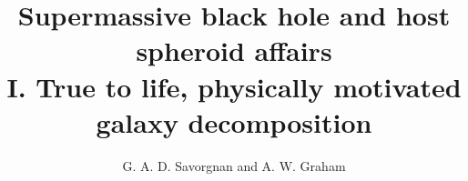 \documentclass[preprint2]{emulateapj}
\begin{document}
\title{Supermassive black hole and host spheroid affairs \\ I. True to life, physically motivated galaxy decomposition}

\author{G. A. D. Savorgnan and A. W. Graham}




\end{document}
